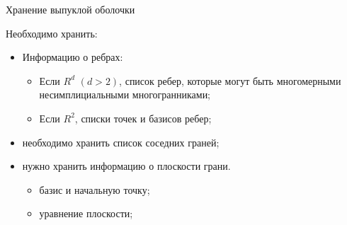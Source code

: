\documentclass[]{beamer} %
\begin{document}
\begin{frame}{Хранение выпуклой оболочки}

    Необходимо хранить:
    \begin{itemize}
        \item Информацию о ребрах:
        \begin{itemize}
            \item Если $R^d$ $(d>2)$, список ребер, которые могут быть многомерными несимплициальными многогранниками;
            \item Если $R^2$, списки точек и базисов ребер;
        \end{itemize}
        \item необходимо хранить список соседних граней;
        \item нужно хранить информацию о плоскости грани.
        \begin{itemize}
            \item базис и начальную точку;
            \item уравнение плоскости;
        \end{itemize}
    \end{itemize}





\end{frame}
\end{document}
